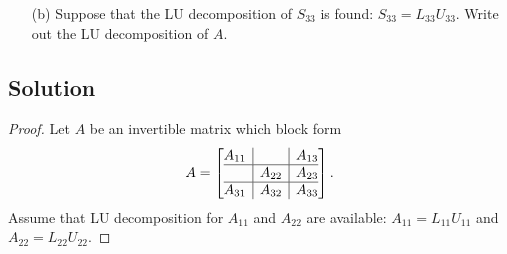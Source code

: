 \documentclass[12pt]{report}
\begin{document}
\begin{problem}
\begin{enumerate}
    \item [(b)] Suppose that the LU decomposition of $S_{33}$ is found: $S_{33} = L_{33}U_{33}$. Write out the LU decomposition of $A$.
\end{enumerate}


\subsection*{Solution}
\begin{proof}

Let $A$ be an invertible matrix which block form
\[
  A = \left[
    \begin{array}{@{}c|c|c@{}}
    A_{11} &&A_{13}\\\hline
    &A_{22}&A_{23}\\\hline
    A_{31} &A_{32} &A_{33}\\
  \end{array}
  \right].
\]
Assume that LU decomposition for $A_{11}$ and $A_{22}$ are available: $A_{11} = L_{11}U_{11}$ and $A_{22} = L_{22}U_{22}$.


\end{proof}
\end{problem}
\end{document}
